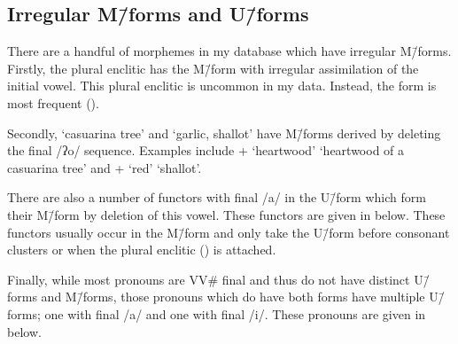\subsection{Irregular M\=/forms and U\=/forms}\label{sec:IrrMfor}
There are a handful of morphemes in my database which have irregular M\=/forms.
Firstly, the plural enclitic 
has the M\=/form  with irregular assimilation of the initial vowel.
This plural enclitic is uncommon in my data.
Instead, the form  is most frequent ().

Secondly,  `casuarina tree'
and  `garlic, shallot' have M\=/forms
derived by deleting the final /ʔo/ sequence.
Examples include  +  `heartwood'
{\ra}  `heartwood of a casuarina tree'
and  +  `red' {\ra}  `shallot'.

There are also a number of functors with final
/a/ in the U\=/form which form their M\=/form by deletion of this vowel.
These functors are given in  below.
These functors usually occur in the M\=/form
and only take the U\=/form before consonant clusters
or when the plural enclitic  () is attached.

\begin{exe}
	\label{ex:CvaCC}
	\gw{}
\end{exe}

Finally, while most pronouns are VV{\#} final and thus
do not have distinct U\=/forms and M\=/forms,
those pronouns which do have both forms have multiple U\=/forms;
one with final /a/ and one with final /i/.
These pronouns are given in  below.

